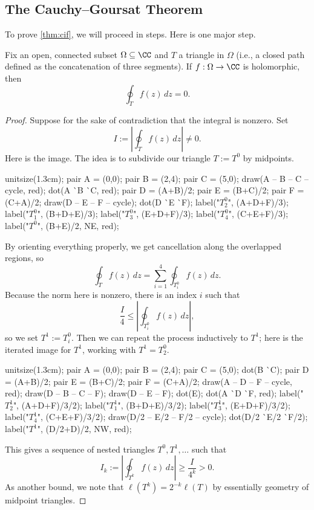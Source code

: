 \subsection{The Cauchy--Goursat Theorem}
To prove \autoref{thm:cif}, we will proceed in steps. Here is one major step.
\begin{theorem} \label{thm:cg}
	Fix an open, connected subset $\Omega\subseteq\CC$ and $T$ a triangle in $\Omega$ (i.e., a closed path defined as the concatenation of three segments). If $f:\Omega\to\CC$ is holomorphic, then
	\[\oint_Tf(z)\,dz=0.\]
\end{theorem}
\begin{proof}
	Suppose for the sake of contradiction that the integral is nonzero. Set
	\[I:=\left|\oint_Tf(z)\,dz\right|\ne0.\]
	Here is the image. The idea is to subdivide our triangle $T:=T^0$ by midpoints.
	\begin{center}
		\begin{asy}
			unitsize(1.3cm);
			pair A = (0,0);
			pair B = (2,4);
			pair C = (5,0);
			draw(A -- B -- C -- cycle, red);
			dot(A ^^ B ^^ C, red);
			pair D = (A+B)/2;
			pair E = (B+C)/2;
			pair F = (C+A)/2;
			draw(D -- E -- F -- cycle);
			dot(D ^^ E ^^ F);
			label("$T_2^0$", (A+D+F)/3);
			label("$T_1^0$", (B+D+E)/3);
			label("$T_3^0$", (E+D+F)/3);
			label("$T_4^0$", (C+E+F)/3);
			label("$T^0$", (B+E)/2, NE, red);
		\end{asy}
	\end{center}
	By orienting everything properly, we get cancellation along the overlapped regions, so
	\[\oint_Tf(z)\,dz=\sum_{i=1}^4\oint_{T^0_i}f(z)\,dz.\]
	Because the norm here is nonzero, there is an index $i$ such that
	\[\frac I4\le\left|\oint_{T^0_i}f(z)\,dz\right|,\]
	so we set $T^1:=T^0_i$. Then we can repeat the process inductively to $T^1$; here is the iterated image for $T^1$, working with $T^1=T^0_2$.
	\begin{center}
		\begin{asy}
			unitsize(1.3cm);
			pair A = (0,0);
			pair B = (2,4);
			pair C = (5,0);
			dot(B ^^ C);
			pair D = (A+B)/2;
			pair E = (B+C)/2;
			pair F = (C+A)/2;
			draw(A -- D -- F -- cycle, red);
			draw(D -- B -- C -- F);
			draw(D -- E -- F);
			dot(E); dot(A ^^ D ^^ F, red);
			label("$T_2^1$", (A+D+F)/3/2);
			label("$T_1^1$", (B+D+E)/3/2);
			label("$T_3^1$", (E+D+F)/3/2);
			label("$T_4^1$", (C+E+F)/3/2);
			draw(D/2 -- E/2 -- F/2 -- cycle);
			dot(D/2 ^^ E/2 ^^ F/2);
			label("$T^1$", (D/2+D)/2, NW, red);
		\end{asy}
	\end{center}
	This gives a sequence of nested triangles $T^0,T^1,\ldots$ such that
	\[I_k:=\left|\oint_{T^k}f(z)\,dz\right|\ge\frac I{4^k}>0.\]
	As another bound, we note that $\ell\left(T^k\right)=2^{-k}\ell(T)$ by essentially geometry of midpoint triangles.


\end{proof}
